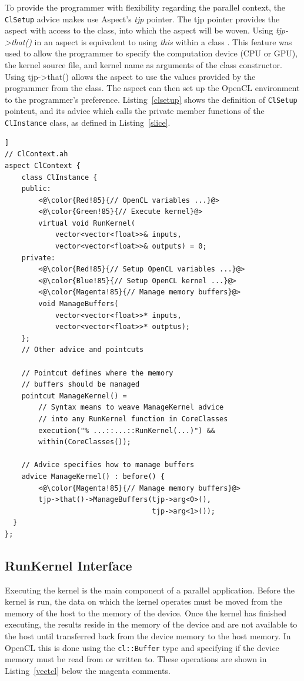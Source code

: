 \documentclass{sig-alternate-05-2015}
\begin{document}
To provide the programmer with flexibility regarding the parallel context,
the \lstinline$ClSetup$ advice makes use Aspect\CPP's \textit{tjp} pointer. 
The tjp pointer provides the aspect with access to the \CPP class, 
into which the aspect will be woven. Using \textit{tjp->that()} in an aspect 
is equivalent to using \textit{this} within a \CPP class . This feature was used 
to allow the programmer to specify the computation device (CPU or GPU), the 
kernel source file, and kernel name as arguments of the \CPP class constructor. 
Using tjp->that() allows the aspect to use the values provided by the 
programmer from the \CPP class. The aspect can then set up the OpenCL environment
to the programmer's preference.
Listing~\ref{clsetup} shows the definition of \lstinline$ClSetup$ pointcut, and its 
advice which calls the private member functions of the \lstinline$ClInstance$
class, as defined in Listing~\ref{slice}.

\begin{lstlisting}[caption=Abstract aspect components which hide kernel
cross-cutting concerns.,label=runkernel,float=[!t]]
// ClContext.ah
aspect ClContext {
	class ClInstance {
	public:
		<@\color{Red!85}{// OpenCL variables ...}@>
		<@\color{Green!85}{// Execute kernel}@>
		virtual void RunKernel(
			vector<vector<float>>& inputs,
			vector<vector<float>>& outputs) = 0;
	private:
		<@\color{Red!85}{// Setup OpenCL variables ...}@>
		<@\color{Blue!85}{// Setup OpenCL kernel ...}@>
		<@\color{Magenta!85}{// Manage memory buffers}@>
		void ManageBuffers(
			vector<vector<float>>* inputs,
			vector<vector<float>>* outptus);
	};
	// Other advice and pointcuts 

	// Pointcut defines where the memory 
	// buffers should be managed
	pointcut ManageKernel() = 
		// Syntax means to weave ManageKernel advice 
		// into any RunKernel function in CoreClasses 
		execution("% ...::...::RunKernel(...)") &&
		within(CoreClasses());

	// Advice specifies how to manage buffers
	advice ManageKernel() : before() {
		<@\color{Magenta!85}{// Manage memory buffers}@>
		tjp->that()->ManageBuffers(tjp->arg<0>(),
								   tjp->arg<1>());
  }
};
\end{lstlisting}

\subsection{RunKernel Interface}

Executing the kernel is the main component of a parallel application. Before the
kernel is run, the data on which the kernel operates must be moved from the
memory of the host to the memory of the device. Once the
kernel has finished executing, the results reside in the memory of the
device and are not available to the host until transferred
back from the device memory to the host memory. In OpenCL this
is done using the \lstinline$cl::Buffer$ type and specifying if the device memory
must be read from or written to. These operations are shown in Listing~\ref{vectcl} 
below the magenta comments. 
\end{document}
